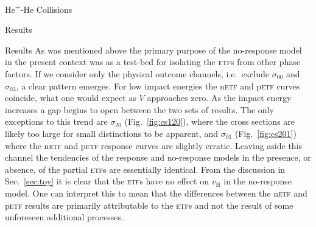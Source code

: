 \documentclass[letterpaper, 11 pt]{report}
\begin{document}
\begin{chapter}{\texorpdfstring{He\textsuperscript{+}}{He+}-He Collisions \label{chap:hephe}}
\begin{section}{Results \label{sec:hephe-disc}}
\begin{subsection}{Results \label{sec:hephe-res}}
         As was mentioned above the primary purpose of the no-response model in the present context was
         as a test-bed for isolating the \textsc{etf}s from other phase factors. If we consider only the
         physical outcome channels, i.e.\ exclude $\sigma_{00}$ and $\sigma_{03}$, a clear pattern
         emerges. For low impact energies the n\textsc{etf} and p\textsc{etf} curves coincide, what one
         would expect as $V$ approaches zero. As the impact energy increases a gap begins to open
         between the two sets of results. The only exceptions to this trend are $\sigma_{20}$
         (Fig.~\ref{fig:cs120}), where the cross sections are likely too large for small distinctions to
         be apparent, and $\sigma_{01}$ (Fig.~\ref{fig:cs201}) where the n\textsc{etf} and p\textsc{etf}
         response curves are slightly erratic. Leaving aside this channel the tendencies of the response
         and no-response models in the presence, or absence, of the partial \textsc{etf}s are
         essentially identical. From the discussion in Sec.~\ref{sec:toy} it is clear that the
         \textsc{etf}s have no effect on $v_\mathrm{H}$ in the no-response model. One can interpret this
         to mean that the differences between the n\textsc{etf} and p\textsc{etf} results are primarily
         attributable to the \textsc{etf}s and not the result of some unforeseen additional processes.


\end{subsection}
\end{section}
\end{chapter}
\end{document}
